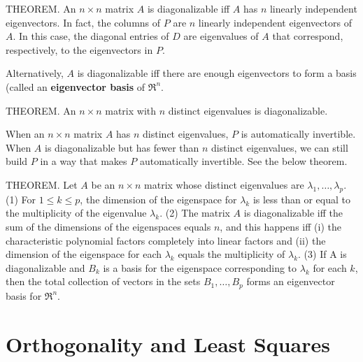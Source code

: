 \documentclass{article}
\begin{document}
\hfill \newline THEOREM. An $n \times n$ matrix $A$ is diagonalizable iff $A$ has $n$ linearly independent eigenvectors. In fact,  the columns of $P$ are $n$ linearly independent eigenvectors of $A$. In this case, the diagonal entries of $D$ are eigenvalues of $A$ that correspond, respectively, to the eigenvectors in $P$.

\hfill \newline Alternatively, $A$ is diagonalizable iff there are enough eigenvectors to form a basis (called an \textbf{eigenvector basis} of $\Re^n$.

\hfill \newline THEOREM. An $n \times n$ matrix with $n$ distinct eigenvalues is diagonalizable.

\hfill \newline When an $n \times n$ matrix $A$ has $n$ distinct eigenvalues, $P$ is automatically invertible. When $A$ is diagonalizable but has fewer than $n$ distinct eigenvalues, we can still build $P$ in a way that makes $P$ automatically invertible. See the below theorem.

\hfill \newline THEOREM. Let $A$ be an $n \times n$ matrix whose distinct eigenvalues are $\lambda_1,\dots,\lambda_p$. (1) For $1 \leq k \leq p$, the dimension of the eigenspace for $\lambda_k$ is less than or equal to the multiplicity of the eigenvalue $\lambda_k$. (2) The matrix $A$ is diagonalizable iff the sum of the dimensions of the eigenspaces equals $n$, and this happens iff (i) the characteristic polynomial factors completely into linear factors and (ii) the dimension of the eigenspace for each $\lambda_k$ equals the multiplicity of $\lambda_k$. (3) If A is diagonalizable and $B_k$ is a basis for the eigenspace corresponding to $\lambda_k$ for each $k$, then the total collection of vectors in the sets $B_1,\dots,B_p$ forms an eigenvector basis for $\Re^n$.

\section{Orthogonality and Least Squares}
\end{document}
